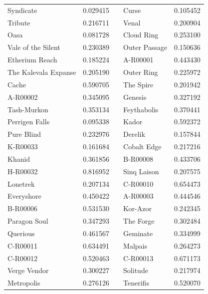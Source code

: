 \documentclass[letterpaper,12pt,article]{memoir}
\begin{document}
\begin{center}
\begin{longtable}{lllll}
    Syndicate               & 0.029415 & & Curse            & 0.105452 \\
    Tribute                 & 0.216711 & & Venal            & 0.200904 \\
    Oasa                    & 0.081728 & & Cloud Ring       & 0.253100 \\
    Vale of the Silent      & 0.230389 & & Outer Passage    & 0.150636 \\
    Etherium Reach          & 0.185224 & & A-R00001         & 0.443430 \\
    The Kalevala Expanse    & 0.205190 & & Outer Ring       & 0.225972 \\
    Cache                   & 0.590705 & & The Spire        & 0.201942 \\
    A-R00002                & 0.345095 & & Genesis          & 0.327192 \\
    Tash-Murkon             & 0.353134 & & Feythabolis      & 0.370441 \\
    Perrigen Falls          & 0.095338 & & Kador            & 0.592372 \\
    Pure Blind              & 0.232976 & & Derelik          & 0.157844 \\
    K-R00033                & 0.161684 & & Cobalt Edge      & 0.217216 \\
    Khanid                  & 0.361856 & & B-R00008         & 0.433706 \\
    H-R00032                & 0.816952 & & Sinq Laison      & 0.207575 \\
    Lonetrek                & 0.207134 & & C-R00010         & 0.654473 \\
    Everyshore              & 0.450422 & & A-R00003         & 0.444546 \\
    B-R00006                & 0.531530 & & Kor-Azor         & 0.242345 \\
    Paragon Soul            & 0.347293 & & The Forge        & 0.302484 \\
    Querious                & 0.461567 & & Geminate         & 0.334999 \\
    C-R00011                & 0.634491 & & Malpais          & 0.264273 \\
    C-R00012                & 0.520463 & & C-R00013         & 0.671173 \\
    Verge Vendor            & 0.300227 & & Solitude         & 0.217974 \\
    Metropolis              & 0.276126 & & Tenerifis        & 0.520070 \\

\end{longtable}
\end{center}
\end{document}
